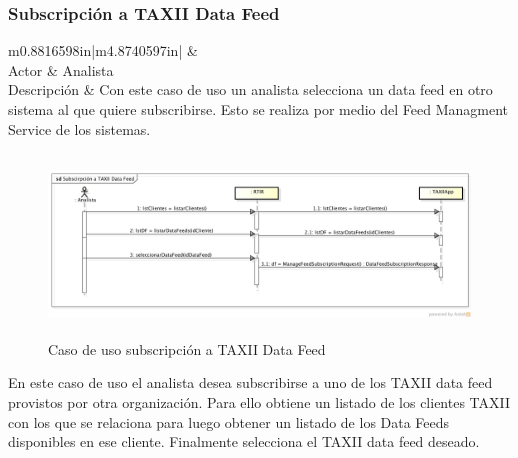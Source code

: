 \subsubsection{Subscripción a TAXII Data Feed}
\begin{flushleft}
	\tablefirsthead{}
	\tablehead{}
	\tabletail{}
	\tablelasttail{}
	\begin{supertabular}{m{0.8816598in}|m{4.8740597in}|}
		 &
		\\\hline
		{ Actor} &
		{ Analista}\\
		{ Descripción} &
		{ Con este caso de uso un analista selecciona un data feed en otro sistema al que
			quiere subscribirse. Esto se realiza por medio del Feed Managment Service de los sistemas.}\\\hhline{~-}
	\end{supertabular}
\end{flushleft}

\bigskip
\begin{figure}[ht!]
	\centering
	\includegraphics[width=5.4217in,height=1.8965in]{Analisis22-img/Analisis22-img027.png}
	\caption{Caso de uso subscripción a TAXII Data Feed}
	\label{fig.subscripciontaxiidatafeed}

\end{figure}

{
	En este caso de uso el analista desea subscribirse a uno de los TAXII data feed provistos por otra organización. Para
	ello obtiene un listado de los clientes TAXII con los que se relaciona para luego obtener un listado de los Data Feeds
	disponibles en ese cliente. Finalmente selecciona el TAXII data feed deseado. }

\newpage
